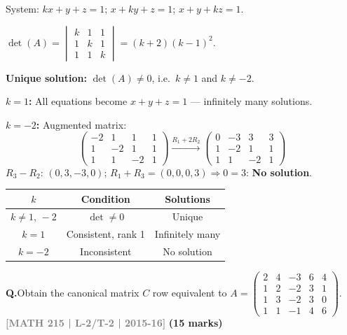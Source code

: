 \documentclass[12pt,a3paper]{article}
\newcommand{\yr}[1]{\hfill\textcolor{gray}{\small\textbf{[#1]}}}
\newcommand{\mk}[1]{\textcolor{orange!70!black}{\small\textbf{(#1 marks)}}}
\newcounter{qnum}
\newcommand{\Q}[1]{%
  \needspace{4\baselineskip}
  \refstepcounter{qnum}
  \vspace{6pt}
  \noindent\textbf{Q\theqnum.}\enspace #1\par
}
\begin{document}
\begin{tcolorbox}[enhanced,breakable,
  colback=cB!4,colframe=cB,boxrule=0.8pt,arc=5pt,
  title={\textbf{Answer --- Values of $k$: Unique/No/Infinitely Many Solutions}},
  fonttitle=\bfseries\color{white},colbacktitle=cB]

System: $kx+y+z=1$;\; $x+ky+z=1$;\; $x+y+kz=1$.

$\det(A)=\begin{vmatrix}k&1&1\\1&k&1\\1&1&k\end{vmatrix}=(k+2)(k-1)^2$.

\textbf{Unique solution:} $\det(A)\neq0$, i.e.\ $k\neq1$ and $k\neq-2$.

\textbf{$k=1$:} All equations become $x+y+z=1$ --- infinitely many solutions.

\textbf{$k=-2$:} Augmented matrix:
\[
\begin{pmatrix}-2&1&1&1\\1&-2&1&1\\1&1&-2&1\end{pmatrix}
\xrightarrow{R_1+2R_2}
\begin{pmatrix}0&-3&3&3\\1&-2&1&1\\1&1&-2&1\end{pmatrix}
\]
$R_3-R_2$: $(0,3,-3,0)$; $R_1+R_3=(0,0,0,3)\Rightarrow 0=3$: \textbf{No solution}.

\begin{center}
\small\begin{tabular}{@{}ccc@{}}
\toprule
$k$ & Condition & Solutions \\
\midrule
$k\neq1,\,-2$ & $\det\neq0$ & Unique \\
$k=1$ & Consistent, rank 1 & Infinitely many \\
$k=-2$ & Inconsistent & No solution \\
\bottomrule
\end{tabular}
\end{center}

\end{tcolorbox}


\Q{Obtain the canonical matrix $C$ row equivalent to $A = \begin{pmatrix} 2 & 4 & -3 & 6 & 4 \\ 1 & 2 & -2 & 3 & 1 \\ 1 & 3 & -2 & 3 & 0 \\ 1 & 1 & -1 & 4 & 6 \end{pmatrix}$.
\yr{MATH 215 | L-2/T-2 | 2015-16} \mk{15}}
\end{document}
